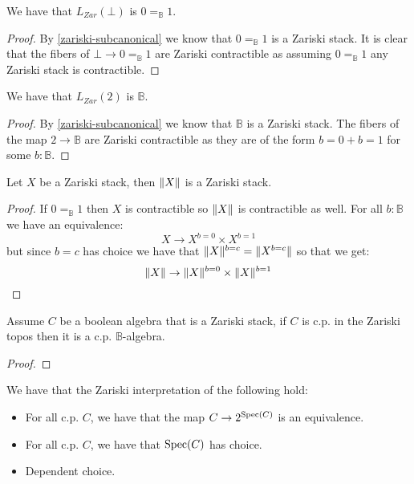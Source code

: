 \begin{lemma}\label{bot-zariski}
We have that $L_{Zar}(\bot)$ is $0=_\mathbb{B}1$.
\end{lemma}

\begin{proof}
By \cref{zariski-subcanonical} we know that $0=_\mathbb{B}1$ is a Zariski stack. It is clear that the fibers of $\bot\to 0=_\mathbb{B}1$ are Zariski contractible as assuming $0=_\mathbb{B}1$ any Zariski stack is contractible.
\end{proof}

\begin{lemma}\label{bool-zariski}
We have that $L_{Zar}({2})$ is $\mathbb{B}$.
\end{lemma}

\begin{proof}
By \cref{zariski-subcanonical} we know that $\mathbb{B}$ is a Zariski stack. The fibers of the map ${2}\to\mathbb{B}$ are Zariski contractible as they are of the form $b=0+b=1$ for some $b:\mathbb{B}$.
\end{proof}

\begin{lemma}\label{truncation-zariski}
Let $X$ be a Zariski stack, then $\lVert X \rVert$ is a Zariski stack.
\end{lemma}

\begin{proof}
If $0=_\mathbb{B}1$ then $X$ is contractible so $\lVert X \rVert$ is contractible as well. For all $b:\mathbb{B}$ we have an equivalence:
\[X\to X^{b=0}\times X^{b=1}\]
but since $b=c$ has choice we have that $\lVert X \rVert^{b=c} = \lVert X^{b=c} \rVert$ so that we get:
\[\lVert X \rVert\to \lVert X \rVert^{b=0}\times \lVert X \rVert^{b=1}\]
\end{proof}

\begin{lemma}\label{zariski-cp-iff-cp}
Assume $C$ be a boolean algebra that is a Zariski stack, if $C$ is c.p. in the Zariski topos then it is a c.p. $\mathbb{B}$-algebra.
\end{lemma}

\begin{proof}
\end{proof}

\begin{theorem}
We have that the Zariski interpretation of the following hold:
\begin{itemize}
\item For all c.p. $C$, we have that the map $C\to {2}^{\operatorname{Spec}(C)}$ is an equivalence.
\item For all c.p. $C$, we have that $\operatorname{Spec}(C)$ has choice.
\item Dependent choice.
\end{itemize}
\end{theorem}

